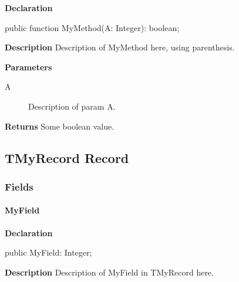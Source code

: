 \documentclass{report}
\begin{document}
\begin{list}{}{
\setlength{\itemindent}{0cm}
\setlength{\listparindent}{0cm}
\setlength{\leftmargin}{\evensidemargin}
\addtolength{\leftmargin}{\tmplength}
\settowidth{\labelsep}{X}
\addtolength{\leftmargin}{\labelsep}
\setlength{\labelwidth}{\tmplength}
}
\begin{flushleft}
\item[\textbf{Declaration}\hfill]
\begin{ttfamily}
public function MyMethod(A: Integer): boolean;\end{ttfamily}


\end{flushleft}
\par
\item[\textbf{Description}]
Description of MyMethod here, using parenthesis.  \par
\item[\textbf{Parameters}]
\begin{description}
\item[A] Description of param A.
\end{description}
\item[\textbf{Returns}]Some boolean value.


\end{list}
\subsection*{TMyRecord Record}
\subsubsection*{\large{\textbf{Fields}}\normalsize\hspace{1ex}\hfill}
\paragraph*{MyField}\hspace*{\fill}

\begin{list}{}{
\setlength{\itemindent}{0cm}
\setlength{\listparindent}{0cm}
\setlength{\leftmargin}{\evensidemargin}
\addtolength{\leftmargin}{\tmplength}
\settowidth{\labelsep}{X}
\addtolength{\leftmargin}{\labelsep}
\setlength{\labelwidth}{\tmplength}
}
\begin{flushleft}
\item[\textbf{Declaration}\hfill]
\begin{ttfamily}
public MyField: Integer;\end{ttfamily}


\end{flushleft}
\par
\item[\textbf{Description}]
Description of MyField in TMyRecord here.

\end{list}
\end{document}
